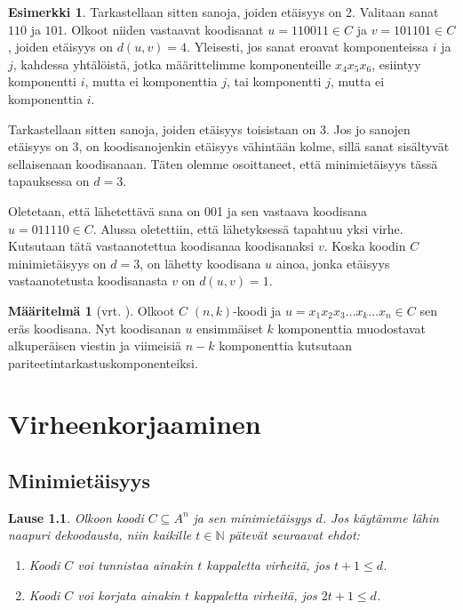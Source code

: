 \documentclass[a4paper,12pt,leqno,oneside]{report} %
\theoremstyle{plain}
\newtheorem{lause}{Lause}[chapter]
\theoremstyle{plain}
\theoremstyle{definition}
\newtheorem{maaritelma}{Määritelmä}[chapter]
\newtheorem{esimerkki}{Esimerkki}[chapter]
\theoremstyle{remark}
\numberwithin{equation}{chapter}
\newcommand*{\Nset}{\mathbb{N}}  %
\begin{document}
\begin{esimerkki}
        Tarkastellaan sitten sanoja, joiden etäisyys on 2. Valitaan sanat $110$ ja $101$. Olkoot niiden vastaavat koodisanat $u = 110011 \in C$ ja $v = 101101 \in C$, joiden etäisyys on $d(u, v) = 4$. Yleisesti, jos sanat eroavat komponenteissa $i$ ja $j$, kahdessa yhtälöistä, jotka määrittelimme komponenteille $x_4x_5x_6$, esiintyy komponentti $i$, mutta ei komponenttia $j$, tai komponentti $j$, mutta ei komponenttia $i$. %

        Tarkastellaan sitten sanoja, joiden etäisyys toisistaan on 3. Jos jo sanojen etäisyys on 3, on koodisanojenkin etäisyys vähintään kolme, sillä sanat sisältyvät sellaisenaan koodisanaan. Täten olemme osoittaneet, että minimietäisyys tässä tapauksessa on $d = 3$.

        Oletetaan, että lähetettävä sana on 001 ja sen vastaava koodisana $u = 011110 \in C$.
        Alussa oletettiin, että lähetyksessä tapahtuu yksi virhe. Kutsutaan tätä vastaanotettua koodisanaa koodisanaksi $v$. Koska koodin $C$ minimietäisyys on $d = 3$, on lähetty koodisana $u$ ainoa, jonka etäisyys vastaanotetusta koodisanasta $v$ on $d(u,v) = 1$.
    \end{esimerkki}

    \begin{maaritelma}[vrt. {\cite[s.~494]{PA}}]\label{maar:nkkoodi}
        Olkoot $C$ $(n, k)$-koodi ja $u = x_1x_2x_3\dots x_k \dots x_n \in C$ sen eräs koodisana. Nyt koodisanan $u$ ensimmäiset $k$ komponenttia muodostavat alkuperäisen viestin ja viimeisiä $n-k$ komponenttia kutsutaan pariteetintarkastuskomponenteiksi.
    \end{maaritelma}

    \chapter{Virheenkorjaaminen}
    \section{Minimietäisyys}

    \begin{lause}\label{lause:nncorrection}
        Olkoon koodi $C \subseteq A^n$ ja sen minimietäisyys $d$. Jos käytämme lähin naapuri dekoodausta, niin kaikille $t \in \Nset$ pätevät seuraavat ehdot:
        \begin{enumerate}
            \item\label{kht:vtunnistus} Koodi $C$ voi tunnistaa ainakin $t$ kappaletta virheitä, jos $t + 1 \le d$.
            \item\label{kht:vkorjaus} Koodi $C$ voi korjata ainakin $t$ kappaletta virheitä, jos $2t + 1 \le d$.
        \end{enumerate}
    \end{lause}
\end{document}
